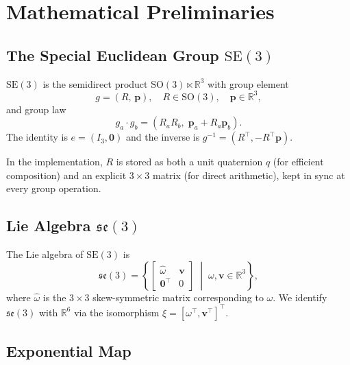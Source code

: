 \documentclass[a4paper,10pt]{article}
\newcommand{\SO}{\mathrm{SO}(3)}
\newcommand{\SE}{\mathrm{SE}(3)}
\newcommand{\se}{\mathfrak{se}(3)}
\newcommand{\R}{\mathbb{R}}
\newcommand{\skw}[1]{\widehat{#1}}
\theoremstyle{definition}
\begin{document}
\section{Mathematical Preliminaries}
\label{sec:math}

\subsection{The Special Euclidean Group $\SE$}

$\SE$ is the semidirect product $\SO \ltimes \R^3$ with group element
\begin{equation}
  g = (R,\,\mathbf{p}),\quad R \in \SO,\quad \mathbf{p} \in \R^3,
  \label{eq:se3_element}
\end{equation}
and group law
\begin{equation}
  g_a \cdot g_b = (R_a R_b,\; \mathbf{p}_a + R_a \mathbf{p}_b).
  \label{eq:se3_product}
\end{equation}
The identity is $e = (I_3, \mathbf{0})$ and the inverse is
$g^{-1} = (R^\top, -R^\top \mathbf{p})$.

In the implementation, $R$ is stored as both a unit quaternion $q$ (for
efficient composition) and an explicit $3 \times 3$ matrix (for direct
arithmetic), kept in sync at every group operation.

\subsection{Lie Algebra $\se$}

The Lie algebra of $\SE$ is
\begin{equation}
  \se = \left\{
    \begin{bmatrix} \skw{\omega} & \mathbf{v} \\ \mathbf{0}^\top & 0 \end{bmatrix}
    \;\middle|\;
    \omega, \mathbf{v} \in \R^3
  \right\},
\end{equation}
where $\skw{\omega}$ is the $3\times 3$ skew-symmetric matrix corresponding to
$\omega$.  We identify $\se$ with $\R^6$ via the isomorphism
$\xi = [\omega^\top, \mathbf{v}^\top]^\top$.

\subsection{Exponential Map}
\end{document}

